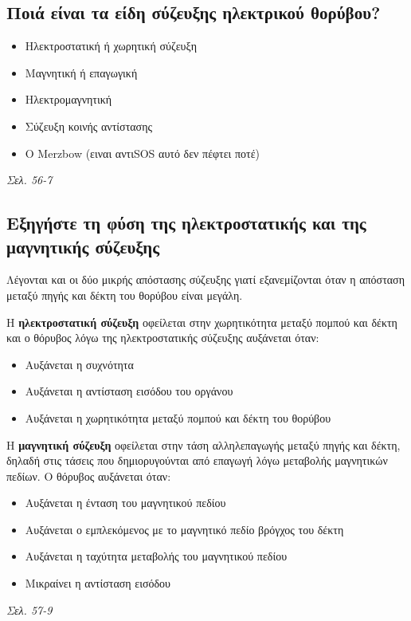 \documentclass{article}
\begin{document}
\subsection{Ποιά είναι τα είδη σύζευξης ηλεκτρικού θορύβου?}
\begin{itemize}
    \item Ηλεκτροστατική ή χωρητική σύζευξη
    \item Μαγνητική ή επαγωγική
    \item Ηλεκτρομαγνητική
    \item Σύζευξη κοινής αντίστασης
    \item O \foreignlanguage{english}{Merzbow} (ειναι αντι\foreignlanguage{english}{SOS} αυτό δεν πέφτει ποτέ)
\end{itemize}

\emph{Σελ. 56-7}
\subsection{Εξηγήστε τη φύση της ηλεκτροστατικής και της μαγνητικής \linebreak σύζευξης}
Λέγονται και οι δύο μικρής απόστασης σύζευξης γιατί εξανεμίζονται όταν η απόσταση μεταξύ πηγής και δέκτη του θορύβου είναι μεγάλη.

Η \textbf{ηλεκτροστατική σύζευξη} οφείλεται στην χωρητικότητα μεταξύ πομπού και δέκτη και ο θόρυβος λόγω της ηλεκτροστατικής σύζευξης αυξάνεται όταν:
\begin{itemize}
    \item Αυξάνεται η συχνότητα
    \item Aυξάνεται η αντίσταση εισόδου του οργάνου
    \item Αυξάνεται η χωρητικότητα μεταξύ πομπού και δέκτη του θορύβου
\end{itemize}

Η \textbf{μαγνητική σύζευξη} οφείλεται στην τάση αλληλεπαγωγής μεταξύ πηγής και δέκτη, δηλαδή στις τάσεις που δημιορυγούνται από επαγωγή λόγω μεταβολής μαγνητικών πεδίων. Ο θόρυβος αυξάνεται όταν:
\begin{itemize}
    \item Aυξάνεται η ένταση του μαγνητικού πεδίου
    \item Αυξάνεται ο εμπλεκόμενος με το μαγνητικό πεδίο βρόγχος του δέκτη
    \item Αυξάνεται η ταχύτητα μεταβολής του μαγνητικού πεδίου
    \item Μικραίνει η αντίσταση εισόδου
\end{itemize}
\emph{Σελ. 57-9}
\end{document}
